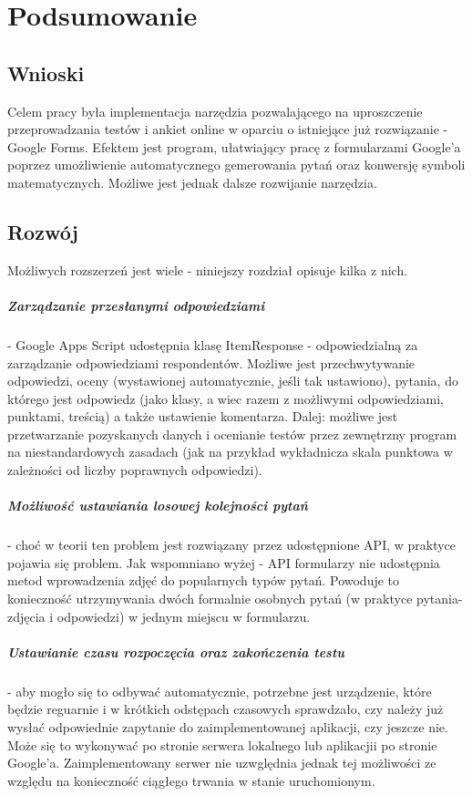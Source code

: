 \chapter{Podsumowanie}%

\section{Wnioski}
Celem pracy była implementacja narzędzia pozwalającego na uproszczenie przeprowadzania testów i ankiet online w oparciu o istniejące już rozwiązanie - Google Forms.  Efektem jest program, ułatwiający pracę z formularzami Google'a poprzez umożliwienie automatycznego gemerowania pytań oraz konwersję symboli matematycznych.  Możliwe jest jednak dalsze rozwijanie narzędzia. 

\section{Rozwój}
Możliwych rozszerzeń jest wiele - niniejszy rozdział opisuje kilka z nich.
\paragraph{Zarządzanie przesłanymi odpowiedziami} - Google Apps Script udostępnia klasę ItemResponse - odpowiedzialną za zarządzanie odpowiedziami respondentów. Możliwe jest przechwytywanie odpowiedzi, oceny (wystawionej automatycznie, jeśli tak ustawiono), pytania, do którego jest odpowiedz (jako klasy, a wiec razem z możliwymi odpowiedziami, punktami, treścią) a także ustawienie komentarza. Dalej: możliwe jest przetwarzanie pozyskanych danych i ocenianie testów przez zewnętrzny program na niestandardowych zasadach (jak na przykład wykładnicza skala punktowa w zależności od liczby poprawnych odpowiedzi).
\paragraph{Możliwość ustawiania losowej kolejności pytań} - choć w teorii ten problem jest rozwiązany przez udostępnione API, w praktyce pojawia się problem. Jak wspomniano wyżej - API formularzy nie udostępnia metod wprowadzenia zdjęć do popularnych typów pytań. Powoduje to konieczność utrzymywania dwóch formalnie osobnych pytań (w praktyce pytania-zdjęcia i odpowiedzi) w jednym miejscu w formularzu.
\paragraph{Ustawianie czasu rozpoczęcia oraz zakończenia testu} - aby mogło się to odbywać automatycznie, potrzebne jest urządzenie, które będzie reguarnie i w krótkich odstępach czasowych sprawdzało, czy należy już wysłać odpowiednie zapytanie do zaimplementowanej aplikacji, czy jeszcze nie. Może się to wykonywać po stronie serwera lokalnego lub aplikacjii po stronie Google'a. Zaimplementowany serwer nie uzwględnia jednak tej możliwości ze względu na konieczność ciągłego trwania w stanie uruchomionym. 


